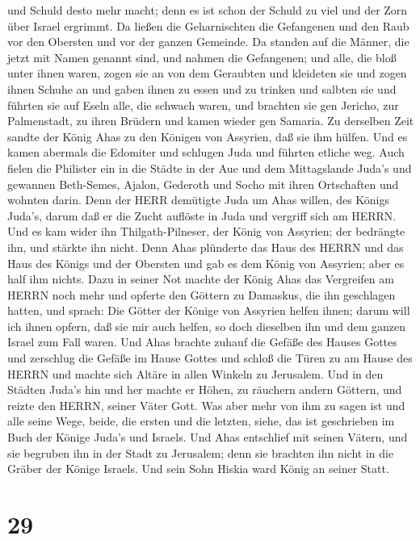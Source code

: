 und Schuld desto mehr macht; denn es ist schon der Schuld zu viel und
der Zorn über Israel ergrimmt.  Da ließen die Geharnischten
die Gefangenen und den Raub vor den Obersten und vor der ganzen
Gemeinde.  Da standen auf die Männer, die jetzt mit Namen
genannt sind, und nahmen die Gefangenen; und alle, die bloß unter ihnen
waren, zogen sie an von dem Geraubten und kleideten sie und zogen ihnen
Schuhe an und gaben ihnen zu essen und zu trinken und salbten sie und
führten sie auf Eseln alle, die schwach waren, und brachten sie gen
Jericho, zur Palmenstadt, zu ihren Brüdern und kamen wieder gen Samaria.
 Zu derselben Zeit sandte der König Ahas zu den Königen von
Assyrien, daß sie ihm hülfen.  Und es kamen abermals die
Edomiter und schlugen Juda und führten etliche weg.  Auch
fielen die Philister ein in die Städte in der Aue und dem Mittagslande
Juda's und gewannen Beth-Semes, Ajalon, Gederoth und Socho mit ihren
Ortschaften und wohnten darin.  Denn der HERR demütigte
Juda um Ahas willen, des Königs Juda's, darum daß er die Zucht auflöste
in Juda und vergriff sich am HERRN.  Und es kam wider ihn
Thilgath-Pilneser, der König von Assyrien; der bedrängte ihn, und
stärkte ihn nicht.  Denn Ahas plünderte das Haus des HERRN
und das Haus des Königs und der Obersten und gab es dem König von
Assyrien; aber es half ihm nichts.  Dazu in seiner Not
machte der König Ahas das Vergreifen am HERRN noch mehr 
und opferte den Göttern zu Damaskus, die ihn geschlagen hatten, und
sprach: Die Götter der Könige von Assyrien helfen ihnen; darum will ich
ihnen opfern, daß sie mir auch helfen, so doch dieselben ihn und dem
ganzen Israel zum Fall waren.  Und Ahas brachte zuhauf die
Gefäße des Hauses Gottes und zerschlug die Gefäße im Hause Gottes und
schloß die Türen zu am Hause des HERRN und machte sich Altäre in allen
Winkeln zu Jerusalem.  Und in den Städten Juda's hin und
her machte er Höhen, zu räuchern andern Göttern, und reizte den HERRN,
seiner Väter Gott.  Was aber mehr von ihm zu sagen ist und
alle seine Wege, beide, die ersten und die letzten, siehe, das ist
geschrieben im Buch der Könige Juda's und Israels.  Und
Ahas entschlief mit seinen Vätern, und sie begruben ihn in der Stadt zu
Jerusalem; denn sie brachten ihn nicht in die Gräber der Könige Israels.
Und sein Sohn Hiskia ward König an seiner Statt.

\hypertarget{section-28}{%
\section{29}\label{section-28}}

